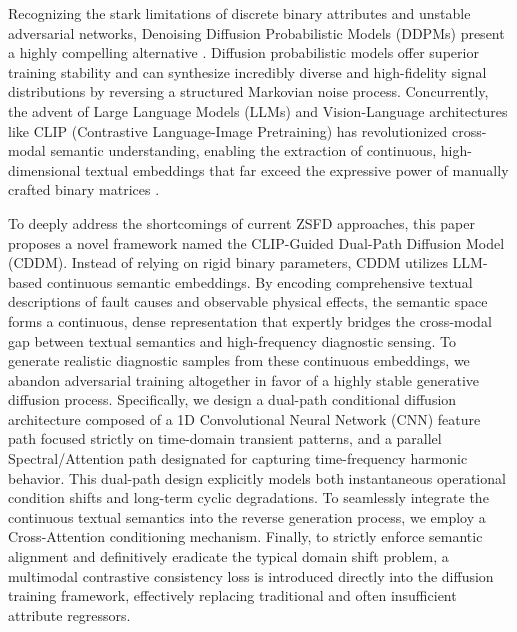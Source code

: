 Recognizing the stark limitations of discrete binary attributes and unstable adversarial networks, Denoising Diffusion Probabilistic Models (DDPMs) \cite{ho2020denoising,dhariwal2021diffusion,song2021denoising} present a highly compelling alternative \cite{feng2021fault}. Diffusion probabilistic models offer superior training stability and can synthesize incredibly diverse and high-fidelity signal distributions by reversing a structured Markovian noise process. Concurrently, the advent of Large Language Models (LLMs) and Vision-Language architectures like CLIP (Contrastive Language-Image Pretraining) \cite{radford2021learning,brown2020language,devlin2019bert} has revolutionized cross-modal semantic understanding, enabling the extraction of continuous, high-dimensional textual embeddings that far exceed the expressive power of manually crafted binary matrices \cite{wang2020deep}.

To deeply address the shortcomings of current ZSFD approaches, this paper proposes a novel framework named the CLIP-Guided Dual-Path Diffusion Model (CDDM). Instead of relying on rigid binary parameters, CDDM utilizes LLM-based continuous semantic embeddings. By encoding comprehensive textual descriptions of fault causes and observable physical effects, the semantic space forms a continuous, dense representation that expertly bridges the cross-modal gap between textual semantics and high-frequency diagnostic sensing. To generate realistic diagnostic samples from these continuous embeddings, we abandon adversarial training altogether in favor of a highly stable generative diffusion process. Specifically, we design a dual-path conditional diffusion architecture composed of a 1D Convolutional Neural Network (CNN) feature path focused strictly on time-domain transient patterns, and a parallel Spectral/Attention path designated for capturing time-frequency harmonic behavior. This dual-path design explicitly models both instantaneous operational condition shifts and long-term cyclic degradations. To seamlessly integrate the continuous textual semantics into the reverse generation process, we employ a Cross-Attention conditioning mechanism. Finally, to strictly enforce semantic alignment and definitively eradicate the typical domain shift problem, a multimodal contrastive consistency loss is introduced directly into the diffusion training framework, effectively replacing traditional and often insufficient attribute regressors.

